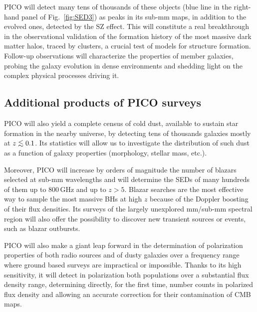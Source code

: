 \documentclass[11pt,a4paper]{article}
\def\simlt{\mathrel{\rlap{\lower 3pt\hbox{$\sim$}}\raise 2.0pt\hbox{$<$}}}
\begin{document}
PICO will detect many tens of thousands of these objects (blue line in the right-hand panel of Fig.~\ref{fig:SED3}) as peaks in its sub-mm maps, in addition to the evolved ones, detected by the SZ effect. This will constitute a real breakthrough in the observational validation of the formation history of the most massive dark matter halos, traced by clusters, a crucial test of models for structure formation. Follow-up observations will characterize the properties of member galaxies, probing the galaxy evolution in dense environments and shedding light on the complex physical processes driving it.

\subsection{Additional products of PICO surveys}

PICO will also yield a complete census of cold dust, available to sustain star formation in the nearby universe, by detecting tens of thousands galaxies mostly at $z\simlt 0.1$. Its statistics will allow us to investigate the distribution of such dust as a function of galaxy properties (morphology, stellar mass, etc.).

Moreover, PICO will increase by orders of magnitude the number of blazars selected at sub-mm wavelengths and will determine the SEDs of many hundreds of them up to 800\,GHz and up to $z> 5$. Blazar searches are the most effective way to sample the most massive BHs at high $z$ because of the Doppler boosting of their flux densities. Its surveys of the largely unexplored mm/sub-mm spectral region will also offer the possibility to discover new transient sources \cite{Metzger2015} or events, such as blazar outbursts.

PICO will also make a giant leap forward in the determination of
polarization properties of both radio sources and of dusty galaxies over a
frequency range where ground based surveys are impractical or impossible.
Thanks to its high sensitivity, it will detect in polarization both populations over a substantial flux density range, determining directly, for the first time, number counts in polarized flux density and allowing an accurate correction for their contamination of CMB maps.

\newpage




\end{document}
